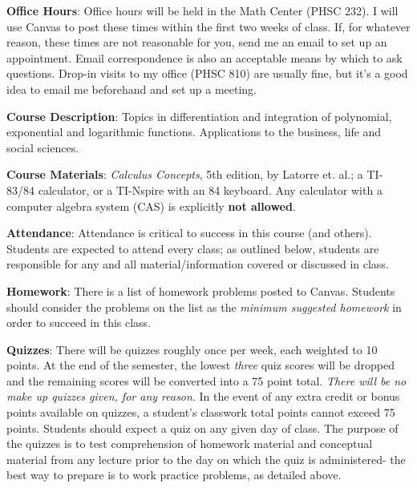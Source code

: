 \documentclass[notes]{subfiles}
\begin{document}
\begin{flushleft}
\textbf{Office Hours}: Office hours will be held in the Math Center (PHSC 232).  I will use Canvas to post these times within the first two weeks of class.  If, for whatever reason, these times are not reasonable for you, send me an email to set up an appointment.  Email correspondence is also an acceptable means by which to ask questions.  Drop-in visits to my office (PHSC 810) are usually fine, but it's a good idea to email me beforehand and set up a meeting.\\ \medskip

\textbf{Course Description}: 
	Topics in differentiation and integration of polynomial, exponential and logarithmic functions. Applications to the business, life and social sciences.
\\ \medskip

\textbf{Course Materials}:
	\emph{Calculus Concepts}, 5th edition, by Latorre et. al.; a TI-83/84 calculator, or a TI-Nspire with an 84 keyboard.  Any calculator with a computer algebra system (CAS) is explicitly \textbf{not allowed}.
\\ \medskip

\textbf{Attendance}:
	Attendance is critical to success in this course (and others).  Students are expected to attend every class; as outlined below, students are responsible for any and all material/information covered or discussed in class.
\\ \medskip

\textbf{Homework}: There is a list of homework problems posted to Canvas.  Students should consider the problems on the list as the \emph{minimum suggested homework} in order to succeed in this class.\\ \medskip

\textbf{Quizzes}: There will be quizzes roughly once per week, each weighted to 10 points. At the end of the semester, the lowest \emph{three} quiz scores will be dropped and the remaining scores will be converted into a 75 point total. \emph{There will be no make up quizzes given, for any reason}. In the event of any extra credit or bonus points available on quizzes, a student's classwork total points cannot exceed 75 points.  Students should expect a quiz on any given day of class.  The purpose of the quizzes is to test comprehension of homework material and conceptual material from any lecture prior to the day on which the quiz is administered- the best way to prepare is to work practice problems, as detailed above.  \\ \medskip


\end{flushleft}
\end{document}
